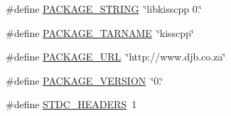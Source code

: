 \begin{DoxyCompactItemize}
\item 
\#define \hyperlink{a00051_ac73e6f903c16eca7710f92e36e1c6fbf}{P\-A\-C\-K\-A\-G\-E\-\_\-\-S\-T\-R\-I\-N\-G}~\char`\"{}libkisscpp 0.\char`\"{}
\item 
\#define \hyperlink{a00051_af415af6bfede0e8d5453708afe68651c}{P\-A\-C\-K\-A\-G\-E\-\_\-\-T\-A\-R\-N\-A\-M\-E}~\char`\"{}kisscpp\char`\"{}
\item 
\#define \hyperlink{a00051_a5c93853116d5a50307b6744f147840aa}{P\-A\-C\-K\-A\-G\-E\-\_\-\-U\-R\-L}~\char`\"{}http\-://www.\-djb.\-co.\-za\char`\"{}
\item 
\#define \hyperlink{a00051_aa326a05d5e30f9e9a4bb0b4469d5d0c0}{P\-A\-C\-K\-A\-G\-E\-\_\-\-V\-E\-R\-S\-I\-O\-N}~\char`\"{}0.\char`\"{}
\item 
\#define \hyperlink{a00051_a550e5c272cc3cf3814651721167dcd23}{S\-T\-D\-C\-\_\-\-H\-E\-A\-D\-E\-R\-S}~1
\end{DoxyCompactItemize}


